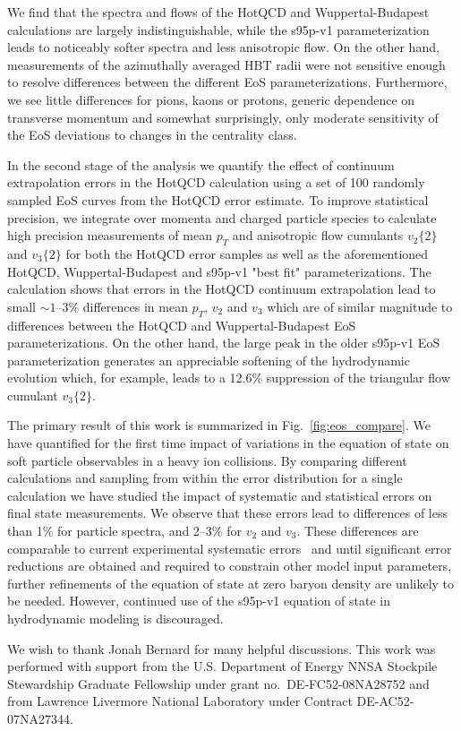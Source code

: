 \documentclass[aps,prc,reprint,amsmath,nofootinbib,superscriptaddress]{revtex4-1}
\begin{document}
We find that the spectra and flows of the HotQCD and Wuppertal-Budapest calculations are largely indistinguishable, while the s95p-v1 parameterization leads to noticeably softer spectra and less anisotropic flow. On the other hand, measurements of the azimuthally averaged HBT radii were not sensitive enough to resolve differences between the different EoS parameterizations. Furthermore, we see little differences for pions, kaons or protons, generic dependence on transverse momentum and somewhat surprisingly, only moderate sensitivity of the EoS deviations to changes in the centrality class.

In the second stage of the analysis we quantify the effect of continuum extrapolation errors in the HotQCD calculation using a set of 100 randomly sampled EoS curves from the HotQCD error estimate. To improve statistical precision, we integrate over momenta and charged particle species to calculate high precision measurements of mean $p_T$ and anisotropic flow cumulants
$v_2\{2\}$ and $v_3\{2\}$ for both the HotQCD error samples as well as the aforementioned HotQCD, Wuppertal-Budapest and s95p-v1 "best fit" parameterizations. The calculation shows that
errors in the HotQCD continuum extrapolation lead to small $\sim\!1$--3\% differences in mean $p_T$, $v_2$ and $v_3$ which are of similar magnitude to differences between the HotQCD and Wuppertal-Budapest EoS parameterizations. On the other hand, the large peak in the older s95p-v1 EoS parameterization generates an appreciable softening of the hydrodynamic evolution which, for example, leads to a 12.6\% suppression of the triangular flow cumulant $v_3\{2\}$.

The primary result of this work is summarized in Fig.~\ref{fig:eos_compare}.  We have quantified for the first time impact of variations in the equation of state on soft particle observables in a heavy ion collisions.  By comparing different calculations and sampling from within the error distribution for a single calculation we have studied the impact of systematic and statistical errors on final state measurements.  We observe that these errors lead to differences of less than 1\% for particle spectra, and 2--3\% for $v_2$ and $v_3$.  These differences are comparable to current experimental systematic errors~\cite{Adamczyk:2013jh,Adare:2011uo} and until significant error reductions are obtained and required to constrain other model input parameters, further refinements of the equation of state at zero baryon density are unlikely to be needed.  However, continued use of the s95p-v1 equation of state in hydrodynamic modeling is discouraged.

\begin{acknowledgments}
We wish to thank Jonah Bernard for many helpful discussions.
This work was performed with support from the U.S. Department of Energy NNSA Stockpile Stewardship Graduate Fellowship under grant no.~DE-FC52-08NA28752 and from Lawrence Livermore National Laboratory under Contract DE-AC52-07NA27344.
\end{acknowledgments}


\end{document}
